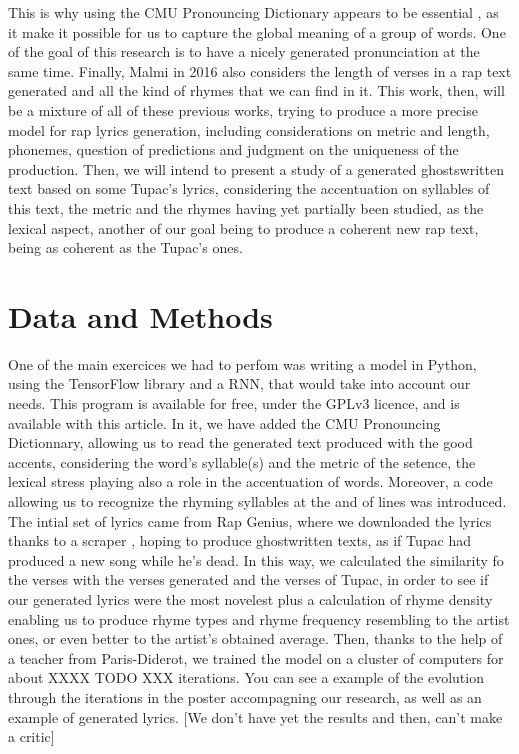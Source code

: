 \documentclass[12pt,a4paper]{article}
\begin{document}
This is why using the CMU Pronouncing Dictionary appears to be essential \cite{hirjee_using_2010}, as it make it possible for us to capture the global meaning of a group of words. One of the goal of this research is to have a nicely generated pronunciation at the same time. Finally, Malmi in 2016 also considers the length of verses in a rap text generated and all the kind of rhymes that we can find in it. This work, then, will be a mixture of all of these previous works, trying to produce a more precise model for rap lyrics generation, including considerations on metric and length, phonemes, question of predictions and judgment on the uniqueness of the production. Then, we will intend to present a study of a generated ghostswritten text based on some Tupac's lyrics, considering the accentuation on syllables of this text, the metric and the rhymes having yet partially been studied, as the lexical aspect, another of our goal being to produce a coherent new rap text, being as coherent as the Tupac's ones. \newline

\section{Data and Methods}

One of the main exercices we had to perfom was writing a model in Python, using the TensorFlow library and a RNN, that would take into account our needs.  This program is available for free, under the GPLv3 licence, and is available with this article. In it, we have added the CMU Pronouncing Dictionnary, allowing us to read the generated text produced with the good accents, considering the word's syllable(s) and the metric of the setence, the lexical stress playing also a role in the accentuation of words. Moreover, a code allowing us to recognize the rhyming syllables at the and of lines was introduced. The intial set of lyrics came from Rap Genius, where we downloaded the lyrics thanks to a scraper \cite{paupier_raplyrics-scraper_2018}, hoping to produce ghostwritten texts, as if Tupac had produced a new song while he's dead. In this way, we calculated the similarity fo the verses with the verses generated and the verses of Tupac, in order to see if our generated lyrics were the most novelest plus a calculation of rhyme density enabling us to produce rhyme types and rhyme frequency resembling to the artist ones, or even better to the artist’s obtained average. Then, thanks to the help of a teacher from Paris-Diderot, we trained the model on a cluster of computers for about XXXX TODO XXX iterations. You can see a example of the evolution through the iterations in the poster accompagning our research, as well as an example of generated lyrics. [We don't have yet the results and then, can't make a critic]



\end{document}
